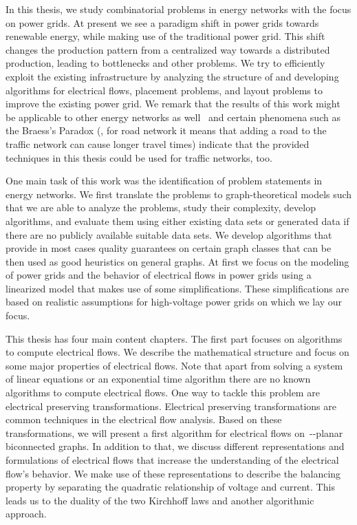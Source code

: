 % 
In this thesis, we study combinatorial problems in energy networks with the
focus on power grids. At present we see a paradigm shift in power grids towards
renewable energy, while making use of the traditional power grid. This shift
changes the production pattern from a centralized way towards a distributed
production, leading to bottlenecks and other problems. We try to efficiently
exploit the existing infrastructure by analyzing the structure of and developing
algorithms for electrical flows, placement problems, and layout problems to
improve the existing power grid. We remark that the results of this work might
be applicable to other energy networks as well~\parencite{Gro19} and certain
phenomena such as the Braess's Paradox (\ie, for road network it means that
adding a road to the traffic network can cause longer travel times) indicate
that the provided techniques in this thesis could be used for traffic networks,
too.

One main task of this work was the identification of problem statements in
energy networks. We first translate the problems to graph-theoretical models
such that we are able to analyze the problems, study their complexity, develop
algorithms, and evaluate them using either existing data sets or generated data
if there are no publicly available suitable data sets. We develop algorithms
that provide in most cases quality guarantees on certain graph classes that can
be then used as good heuristics on general graphs. At first we focus on the
modeling of power grids and the behavior of electrical flows in power grids
using a linearized model that makes use of some simplifications. These
simplifications are based on realistic assumptions for high-voltage power grids
on which we lay our focus.

This thesis has four main content chapters. The first part focuses on algorithms
to compute electrical flows. We describe the mathematical structure and focus on
some major properties of electrical flows. Note that apart from solving a system
of linear equations or an exponential time algorithm there are no known
algorithms to compute electrical flows. One way to tackle this problem are
electrical preserving transformations. Electrical preserving transformations are
common techniques in the electrical flow analysis. Based on these
transformations, we will present a first algorithm for electrical flows
on~\source-\sink-planar biconnected graphs. In addition to that, we discuss
different representations and formulations of electrical flows that increase the
understanding of the electrical flow's behavior. We make use of these
representations to describe the balancing property by separating the quadratic
relationship of voltage and current. This leads us to the duality of the two
Kirchhoff laws and another algorithmic approach.


